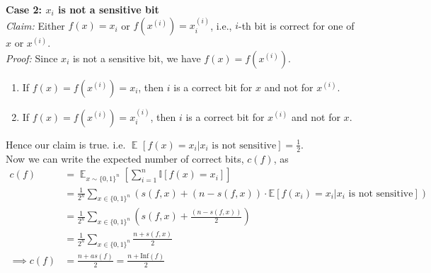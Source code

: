 \documentclass{article}
\newcommand{\E}[2]{\mathop{\mathbb{E}}_{#1}\left[#2\right]}
\begin{document}
\noindent
\textbf{Case 2: $x_i$ is not a sensitive bit} \\
\textit{Claim:} Either $f(x) = x_i$ or $f(x^{(i)}) = x^{(i)}_i$, i.e., $i$-th bit is correct for one of $x$ or $x^{(i)}$. \\
\textit{Proof:} Since $x_i$ is not a sensitive bit, we have $f(x) = f(x^{(i)})$.
\begin{enumerate}
	\item If $f(x) = f(x^{(i)}) = x_i$, then $i$ is a correct bit for $x$ and not for $x^{(i)}$.
	\item If $f(x) = f(x^{(i)}) = x^{(i)}_i$, then $i$ is a correct bit for $x^{(i)}$ and not for $x$.
\end{enumerate}
Hence our claim is true. i.e. $\E{}{f(x) = x_i | x_i \text{ is not sensitive}} = \frac{1}{2}$. \\

\noindent
Now we can write the expected number of correct bits, $c(f)$, as
\begin{align}
	c(f) &= \E{x \sim {\{0, 1\}}^n}{\sum_{i=1}^n \mathbb{I}[f(x) = x_i]} \\
	&= \frac{1}{2^n} \sum_{x \in {\{0, 1\}}^n} \left( s(f, x) + (n - s(f, x)) \cdot \mathbb{E}[f(x_i) = x_i | x_i \text{ is not sensitive}]\right) \\
	&= \frac{1}{2^n} \sum_{x \in {\{0, 1\}}^n} \left( s(f, x) + \frac{(n - s(f, x))}{2}\right) \\
	&= \frac{1}{2^n} \sum_{x \in {\{0, 1\}}^n} \frac{n + s(f, x)}{2} \\
\implies c(f) &= \frac{n + as(f)}{2} = \frac{n + \text{Inf}(f)}{2}
\end{align}
\vspace*{-8mm}\begin{flushright}\qedsymbol\end{flushright}


\subsection{} \vspace*{-8mm}
\end{document}
